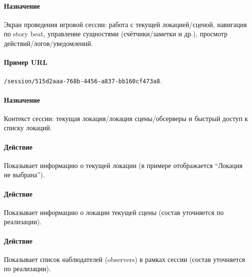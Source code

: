 
\paragraph{Назначение}
Экран проведения игровой сессии: работа с текущей локацией/сценой, навигация по story beat, управление сущностями (счётчики/заметки и др.), просмотр действий/логов/уведомлений.

\paragraph{Пример URL}
\texttt{/session/515d2aaa-768b-4456-a837-bb160cf473a8}.



\paragraph{Назначение}
Контекст сессии: текущая локация/локация сцены/обсерверы и быстрый доступ к списку локаций.

\paragraph{Действие}
Показывает информацию о текущей локации (в примере отображается ``Локация не выбрана'').

\paragraph{Действие}
Показывает информацию о локации текущей сцены (состав уточняется по реализации).

\paragraph{Действие}
Показывает список наблюдателей (observers) в рамках сессии (состав уточняется по реализации).

